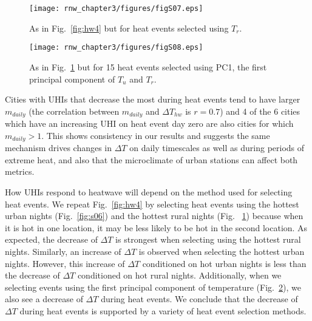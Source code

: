 {%
\begin{figure}
\texttt{[image: rnw\_chapter3/figures/figS07.eps]}
\caption{As in Fig.~\ref{fig:hw4} but for heat events selected using $T_r$. 
\label{fig:s07}
}
\end{figure}

\begin{figure}
\texttt{[image: rnw\_chapter3/figures/figS08.eps]}
\caption{As in Fig.~\ref{fig:s07} but for 15 heat events selected using PC1, the first principal component of $T_u$ and $T_r$. %
\label{fig:s08}
}
\end{figure}

Cities with UHIs that decrease the most during heat events tend to have larger $m_{daily}$ (the correlation between $m_{daily}$ and $\Delta T_{hw}$ is $r =0.7 $) and 4 of the 6 cities which have an increasing UHI on heat event day zero are also cities for which $m_{daily} >1$. This shows consistency in our results and suggests the same mechanism drives changes in $\Delta T$ on daily timescales as well as during periods of extreme heat, and also that the microclimate of urban stations can affect both metrics. 

How UHIs respond to heatwave will depend on the method used for selecting heat events. 
We repeat Fig.~\ref{fig:hw4} by selecting heat events using the hottest urban nights (Fig.~\ref{fig:s06}) and the hottest rural nights (Fig.~ \ref{fig:s07}) because when it is hot in one location, it may be less likely to be hot in the second location.
As expected, the decrease of $\Delta T$ is strongest when selecting using the hottest rural nights. Similarly, an increase of $\Delta T$ is observed when selecting the hottest urban nights. However, this increase of $\Delta T$ conditioned on hot urban nights is less than the decrease of $\Delta T$ conditioned on hot rural nights. Additionally, when we selecting events using the first principal component of temperature (Fig.~\ref{fig:s08}), we also see a decrease of $\Delta T$ during heat events.  We conclude that the decrease of $\Delta T$ during heat events is supported by a variety of heat event selection methods. 

}
